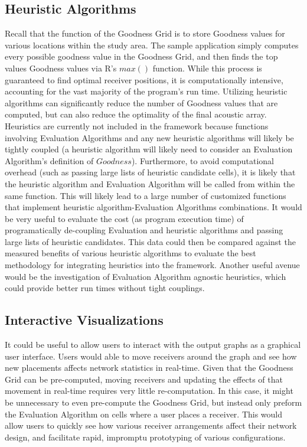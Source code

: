 \subsection{Heuristic Algorithms}
\label{heuristics}
Recall that the function of the Goodness Grid is to store Goodness values for various locations within the study area.  The sample application simply computes every possible goodness value in the Goodness Grid, and then finds the top values Goodness values via R's $max()$ function.  While this process is guaranteed to find optimal receiver positions, it is computationally intensive, accounting for the vast majority of the program's run time.  Utilizing heuristic algorithms can significantly reduce the number of Goodness values that are computed, but can also reduce the optimality of the final acoustic array.  Heuristics are currently not included in the framework because functions involving Evaluation Algorithms and any new heuristic algorithms will likely be tightly coupled (a heuristic algorithm will likely need to consider an Evaluation Algorithm's definition of $Goodness$).  Furthermore, to avoid computational overhead (such as passing large lists of heuristic candidate cells), it is likely that the heuristic algorithm and Evaluation Algorithm will be called from within the same function.  This will likely lead to a large number of customized functions that implement heuristic algorithm-Evaluation Algorithms combinations.  It would be very useful to evaluate the cost (as program execution time) of programatically de-coupling Evaluation and heuristic algorithms and passing large lists of heuristic candidates.  This data could then be compared against the measured benefits of various heuristic algorithms to evaluate the best methodology for integrating heuristics into the framework.  Another useful avenue would be the investigation of Evaluation Algorithm agnostic heuristics, which could provide better run times without tight couplings.

\subsection{Interactive Visualizations}
It could be useful to allow users to interact with the output graphs as a graphical user interface.  Users would able to move receivers around the graph and see how new placements affects network statistics in real-time.  Given that the Goodness Grid can be pre-computed, moving receivers and updating the effects of that movement in real-time requires very little re-computation.  In this case, it might be unnecessary to even pre-compute the Goodness Grid, but instead only preform the Evaluation Algorithm on cells where a user places a receiver.  This would allow users to quickly see how various receiver arrangements affect their network design, and facilitate rapid, impromptu prototyping of various configurations.  

